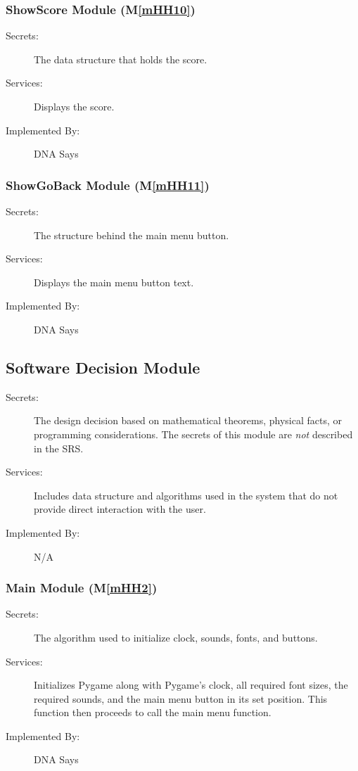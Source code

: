 \documentclass[12pt, titlepage]{article}
\newcommand{\mref}[1]{M\ref{#1}}
\begin{document}
\subsubsection{ShowScore Module (\mref{mHH10})}
\begin{description}
\item[Secrets:]The data structure that holds the score.
\item[Services:]Displays the score.
\item[Implemented By:] DNA Says
\end{description}

\subsubsection{ShowGoBack Module (\mref{mHH11})}
\begin{description}
\item[Secrets:]The structure behind the main menu button.
\item[Services:]Displays the main menu button text.
\item[Implemented By:] DNA Says
\end{description}


\subsection{Software Decision Module}
\begin{description}
\item[Secrets:] The design decision based on mathematical theorems, physical
  facts, or programming considerations. The secrets of this module are
  \emph{not} described in the SRS.
\item[Services:] Includes data structure and algorithms used in the system that
  do not provide direct interaction with the user. 
\item[Implemented By:] N/A
\end{description}

\subsubsection{Main Module (\mref{mHH2})}
\begin{description}
\item[Secrets:]The algorithm used to initialize clock, sounds, fonts, and buttons.
\item[Services:]Initializes Pygame along with Pygame's clock, all required font sizes, the required sounds, and the main menu button in its set position. This function then proceeds to call the main menu function.
\item[Implemented By:] DNA Says
\end{description}
\end{document}
